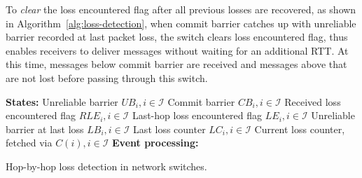 To \textit{clear} the loss encountered flag after all previous losses are recovered, as shown in Algorithm~\ref{alg:loss-detection}, when commit barrier catches up with unreliable barrier recorded at last packet loss, the switch clears loss encountered flag, thus enables receivers to deliver messages without waiting for an additional RTT.
At this time, messages below commit barrier are received and messages above that are not lost before passing through this switch.




\setlength{\textfloatsep}{1em}
\begin{algorithm}[t]
 \DontPrintSemicolon
 \textbf{States:} Unreliable barrier $UB_i, i \in \mathcal{I}$\;
 	\qquad Commit barrier $CB_i, i \in \mathcal{I}$\;
    \qquad Received loss encountered flag $RLE_i, i \in \mathcal{I}$\;
 	\qquad Last-hop loss encountered flag $LE_i, i \in \mathcal{I}$\;
    \qquad Unreliable barrier at last loss $LB_i, i \in \mathcal{I}$\;
    \qquad Last loss counter $LC_i, i \in \mathcal{I}$\;
    \qquad Current loss counter, fetched via $C(i), i \in \mathcal{I}$\;
 \textbf{Event processing:}\\
 \caption{Hop-by-hop loss detection in network switches.}
 \label{alg:loss-detection}
\end{algorithm}



